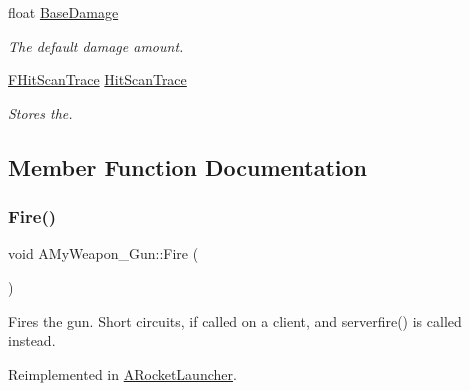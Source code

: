 \begin{DoxyCompactItemize}
float \mbox{\hyperlink{class_a_my_weapon___gun_a249e1fd79607e29492373ec47fdea572}{Base\+Damage}}
\begin{DoxyCompactList}\small\item\em The default damage amount. \end{DoxyCompactList}\item 
\mbox{\label{class_a_my_weapon___gun_a63a32b90438b170a8b5b41a83051cb3e}} 
\mbox{\hyperlink{struct_f_hit_scan_trace}{F\+Hit\+Scan\+Trace}} \mbox{\hyperlink{class_a_my_weapon___gun_a63a32b90438b170a8b5b41a83051cb3e}{Hit\+Scan\+Trace}}
\begin{DoxyCompactList}\small\item\em Stores the. \end{DoxyCompactList}\end{DoxyCompactItemize}


\subsection{Member Function Documentation}
\mbox{\label{class_a_my_weapon___gun_a8b430c2ea96f507fa29e2eceb7ebc552}} 
\subsubsection{\texorpdfstring{Fire()}{Fire()}}
{\footnotesize\ttfamily void A\+My\+Weapon\+\_\+\+Gun\+::\+Fire (\begin{DoxyParamCaption}{ }\end{DoxyParamCaption})\hspace{0.3cm}{\ttfamily [virtual]}}

Fires the gun. Short circuits, if called on a client, and serverfire() is called instead. 

Reimplemented in \mbox{\hyperlink{class_a_rocket_launcher_a32f4db5a70f3a9e6b8cf0d8c0e84f78b}{A\+Rocket\+Launcher}}.

\mbox{\label{class_a_my_weapon___gun_a8d4f24314bfe7d7f722f1f03a9b52936}} 
